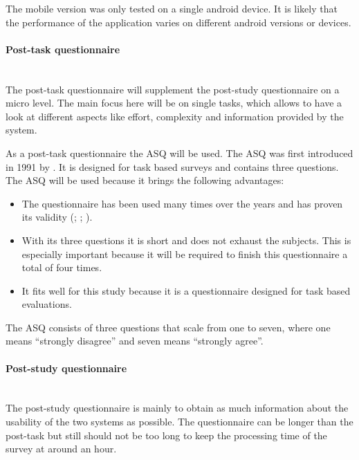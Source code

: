 The mobile version was only tested on a single \gls{android} device.
It is likely that the performance of the application varies on different \gls{android} versions or devices.

\paragraph{Post-task questionnaire}\mbox{}\\
The \gls{post-task} questionnaire will supplement the \gls{post-study} questionnaire on a micro level.
The main focus here will be on single tasks, which allows to have a look at different aspects like effort, complexity and information provided by the system. 

As a \gls{post-task} questionnaire the \gls{ASQ} will be used. 
The \gls{ASQ} was first introduced in 1991 by \cite{lewis1991psychometric}.
It is designed for task based surveys and contains three questions.
The \gls{ASQ} will be used because it brings the following advantages:
\begin{itemize}
  \item The questionnaire has been used many times over the years and has proven its validity (\cite{hajesmaeel2022most}; \cite{lewis1991psychometric}; \cite{lewis1995ibm}).
  \item With its three questions it is short and does not exhaust the subjects. This is especially important because it will be required to finish this questionnaire a total of four times.
  \item It fits well for this study because it is a questionnaire designed for task based evaluations.
\end{itemize}
The \gls{ASQ} consists of three questions that scale from one to seven, where one means \enquote{strongly disagree} and seven means \enquote{strongly agree}.

\paragraph{Post-study questionnaire}\mbox{}\\
The \gls{post-study} questionnaire is mainly to obtain as much information about the \gls{usability} of the two systems as possible.
The questionnaire can be longer than the \gls{post-task} but still should not be too long to keep the processing time of the survey at around an hour.

